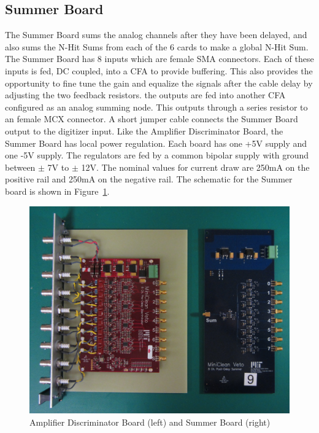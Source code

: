 \documentclass{JINST}
\begin{document}
\subsection{Summer Board}
\label{sec:Sum}
%
The Summer Board sums the analog channels after they have been
delayed, and also sums the N-Hit Sums from each of the 6 cards to make
a global N-Hit Sum.  The Summer Board has 8 inputs which are female
SMA connectors.  Each of these inputs is fed, DC coupled, into a CFA
to provide buffering.  This also provides the opportunity to fine tune
the gain and equalize the signals after the cable delay by adjusting
the two feedback resistors.  the outputs are fed into another CFA
configured as an analog summing node.  This outputs through a series
resistor to an female MCX connector.  A short jumper cable connects
the Summer Board output to the digitizer input.  Like the Amplifier
Discriminator Board, the Summer Board has local power regulation.
Each board has one +5V supply and one -5V supply.  The regulators are
fed by a common bipolar supply with ground between $\pm$ 7V to $\pm$
12V.  The nominal values for current draw are 250mA on the positive
rail and 250mA on the negative rail.  The schematic for the Summer
board is shown in Figure~\ref{fig:boards}.

\begin{figure}[ht]
\begin{center}
\includegraphics[width=5in, keepaspectratio=true]{graphics/boards}
\caption{Amplifier Discriminator Board (left) and Summer Board (right)}
\label{fig:boards}
\end{center}
\end{figure}
\end{document}
